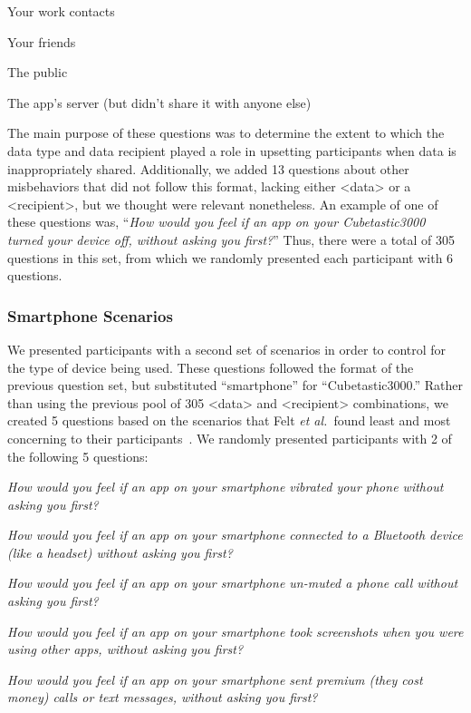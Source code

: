 \documentclass{acm_proc_article-sp}
\def\etal{{\it et al.~}}
\newenvironment{packed_item}{
\begin{itemize}
  \setlength{\itemsep}{1pt}
  \setlength{\parskip}{0pt}
  \setlength{\parsep}{0pt}
}{\end{itemize}}
\begin{document}
\begin{packed_item}
\item Your work contacts
\item Your friends
\item The public
\item The app's server (but didn't share it with anyone else)
\end{packed_item}

The main purpose of these questions was to determine the extent to which the data type and data recipient played a role in upsetting participants when data is inappropriately shared. Additionally, we added 13 questions about other misbehaviors that did not follow this format, lacking either <data> or a <recipient>, but we thought were relevant nonetheless. An example of one of these questions was, ``\textit{How would you feel if an app on your Cubetastic3000 turned your device off, without asking you first?}'' Thus, there were a total of 305 questions in this set, from which we randomly presented each participant with 6 questions.

\subsubsection{Smartphone Scenarios}
We presented participants with a second set of scenarios in order to control for the type of device being used. These questions followed the format of the previous question set, but substituted ``smartphone'' for ``Cubetastic3000.'' Rather than using the previous pool of 305 <data> and <recipient> combinations, we created 5 questions based on the scenarios that Felt \etal found least and most concerning to their participants~\cite{Felt}. We randomly presented participants with 2 of the following 5 questions:

\begin{packed_item}
\item \textit{How would you feel if an app on your smartphone vibrated your phone without asking you first?}
\item \textit{How would you feel if an app on your smartphone connected to a Bluetooth device (like a headset) without asking you first?}
\item \textit{How would you feel if an app on your smartphone un-muted a phone call without asking you first?}
\item \textit{How would you feel if an app on your smartphone took screenshots when you were using other apps, without asking you first?}
\item \textit{How would you feel if an app on your smartphone sent premium (they cost money) calls or text messages, without asking you first?}
\end{packed_item}
\end{document}
